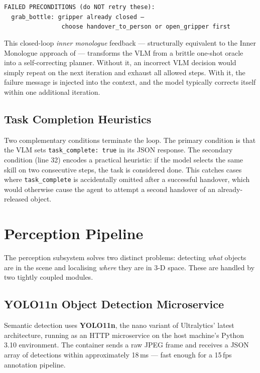 \begin{mdframed}[style=promptbox]
\texttt{FAILED PRECONDITIONS (do NOT retry these):}\\
\texttt{~~grab\_bottle: gripper already closed ---}\\
\texttt{~~~~~~~~~~~~~~~~choose handover\_to\_person or open\_gripper first}
\end{mdframed}

This closed-loop \emph{inner monologue} feedback --- structurally equivalent to
the Inner Monologue approach of \cite{huang2022inner} --- transforms the VLM
from a brittle one-shot oracle into a self-correcting planner.
Without it, an incorrect VLM decision would simply repeat on the next iteration
and exhaust all allowed steps.
With it, the failure message is injected into the context, and the model
typically corrects itself within one additional iteration.

\subsection{Task Completion Heuristics}

Two complementary conditions terminate the loop.
The primary condition is that the VLM sets \texttt{task\_complete: true} in its
JSON response.
The secondary condition (line 32) encodes a practical heuristic: if the model
selects the same skill on two consecutive steps, the task is considered done.
This catches cases where \texttt{task\_complete} is accidentally omitted after
a successful handover, which would otherwise cause the agent to attempt a second
handover of an already-released object.

\section{Perception Pipeline}
\label{sec:perception}

The perception subsystem solves two distinct problems: detecting \emph{what}
objects are in the scene and localising \emph{where} they are in 3-D space.
These are handled by two tightly coupled modules.

\subsection{YOLO11n Object Detection Microservice}

Semantic detection uses \textbf{YOLO11n}, the nano variant of Ultralytics'
latest architecture, running as an HTTP microservice on the host machine's
Python 3.10 environment.
The container sends a raw JPEG frame and receives a JSON array of detections
within approximately 18\,ms --- fast enough for a 15\,fps annotation pipeline.

